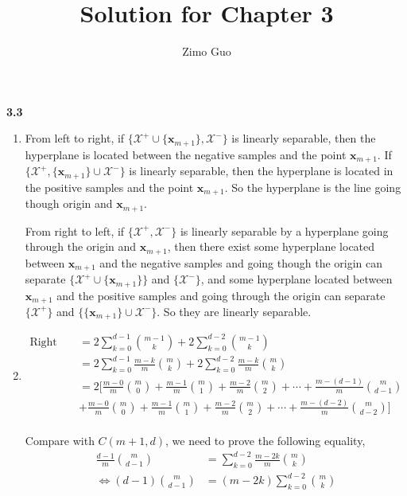 \documentclass[12pt]{article}
\title{Solution for Chapter 3}
\author{Zimo Guo}
\date{}
\begin{document}
\maketitle

\noindent \textbf{3.3}

\begin{enumerate}[label=(\alph*), left=0pt] %
    \item 
    From left to right, if $\{\mathcal{X}^{+} \cup \{\textbf{x}_{m+1}\}, \mathcal{X}^{-}\}$ is 
    linearly separable, then the hyperplane is located between the negative samples and the 
    point $\textbf{x}_{m+1}$. If $\{\mathcal{X}^{+}, \{\textbf{x}_{m+1}\} \cup \mathcal{X}^{-}\}$ 
    is linearly separable, then the hyperplane is located in the positive samples and the point 
    $\textbf{x}_{m+1}$. So the hyperplane is the line going though origin and $\textbf{x}_{m+1}$.

    From right to left, if $\{\mathcal{X}^{+}, \mathcal{X}^{-}\}$ 
    is linearly separable by a hyperplane going through the origin and $\textbf{x}_{m+1}$, then 
    there exist some hyperplane located between $\textbf{x}_{m+1}$ and the negative samples and going 
    though the origin can separate $\{\mathcal{X}^{+} \cup \{\textbf{x}_{m+1}\}\}$ and 
    $\{\mathcal{X}^{-}\}$, and some hyperplane located between $\textbf{x}_{m+1}$ and the 
    positive samples and going through the origin can separate $\{\mathcal{X}^{+}\}$ and 
    $\{\{\textbf{x}_{m+1}\} \cup \mathcal{X}^{-}\}$. So they are linearly separable.

    \item 
    \begin{align*}
        \text{Right hand side} &= 2\sum_{k=0}^{d-1} \binom{m-1}{k} + 2\sum_{k=0}^{d-2} \binom{m-1}{k} \\
        &= 2\sum_{k=0}^{d-1} \frac{m-k}{m}\binom{m}{k} + 2\sum_{k=0}^{d-2} \frac{m-k}{m}\binom{m}{k} \\
        &= 2[\frac{m-0}{m}\binom{m}{0} + \frac{m-1}{m}\binom{m}{1} + \frac{m-2}{m}\binom{m}{2} + \cdots + 
        \frac{m-(d-1)}{m}\binom{m}{d-1} \\
        &+ \frac{m-0}{m}\binom{m}{0} + \frac{m-1}{m}\binom{m}{1} + \frac{m-2}{m}\binom{m}{2} + \cdots + 
        \frac{m-(d-2)}{m}\binom{m}{d-2}] \\
    \end{align*}
    
    Compare with $C(m+1, d)$, we need to prove the following equality,
    \begin{align*}
        \frac{d-1}{m}\binom{m}{d-1} &= \sum_{k=0}^{d-2}\frac{m-2k}{m}\binom{m}{k} \\
        \iff (d-1)\binom{m}{d-1} &= (m-2k)\sum_{k=0}^{d-2}\binom{m}{k}
    \end{align*}


\end{enumerate}
\end{document}
